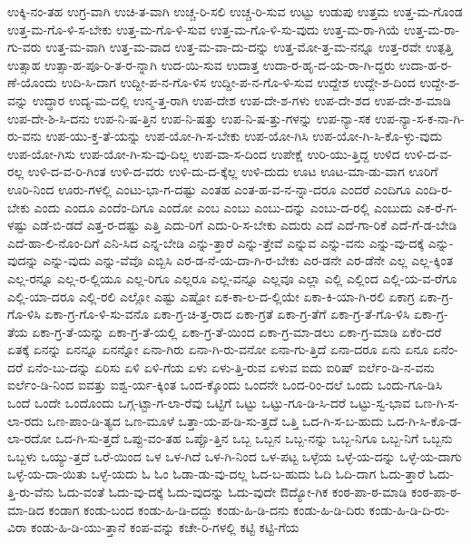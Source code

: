 {ಉಕ್ಕಿ-ನಂ-ತಹ
ಉಗ್ರ-ವಾಗಿ
ಉಚಿ-ತ-ವಾಗಿ
ಉಚ್ಚ-ರಿ-ಸಲಿ
ಉಚ್ಚ-ರಿ-ಸುವ
ಉಟ್ಟು
ಉಡುಪು
ಉತ್ತಮ
ಉತ್ತ-ಮ-ಗೊಂಡ
ಉತ್ತ-ಮ-ಗೊ-ಳಿ-ಸ-ಬೇಕು
ಉತ್ತ-ಮ-ಗೊ-ಳಿ-ಸುವ
ಉತ್ತ-ಮ-ಗೊ-ಳಿ-ಸು-ವುದು
ಉತ್ತ-ಮ-ರಾ-ಗಿಯೆ
ಉತ್ತ-ಮ-ರಾ-ಗು-ವರು
ಉತ್ತ-ಮ-ವಾಗಿ
ಉತ್ತ-ಮ-ವಾದ
ಉತ್ತ-ಮ-ವಾ-ದು-ದನ್ನು
ಉತ್ತ-ಮೋ-ತ್ತ-ಮ-ನನ್ನೂ
ಉತ್ತ-ರವೇ
ಉತ್ಪತ್ತಿ
ಉತ್ಸಾಹ
ಉತ್ಸಾ-ಹ-ಪೂ-ರಿ-ತ-ರ-ನ್ನಾಗಿ
ಉದ-ಯಿ-ಸುವ
ಉದಾತ್ತ
ಉದಾ-ರ-ಹೃ-ದ-ಯ-ರಾ-ಗಿ-ದ್ದರು
ಉದಾ-ಹ-ರ-ಣೆ-ಯೊಂದು
ಉದಿ-ಸಿ-ದಾಗ
ಉದ್ದೀ-ಪ-ನ-ಗೊ-ಳಿಸ
ಉದ್ದೀ-ಪ-ನ-ಗೊ-ಳಿ-ಸುವ
ಉದ್ದೇಶ
ಉದ್ದೇ-ಶ-ದಿಂದ
ಉದ್ದೇ-ಶ-ವನ್ನು
ಉದ್ಧಾರ
ಉದ್ಯ-ಮ-ದಲ್ಲಿ
ಉನ್ಮ-ತ್ತ-ರಾಗಿ
ಉಪ-ದೇಶ
ಉಪ-ದೇ-ಶ-ಗಳು
ಉಪ-ದೇ-ಶದ
ಉಪ-ದೇ-ಶ-ಮಾಡಿ
ಉಪ-ದೇ-ಶಿ-ಸಿ-ದನು
ಉಪ-ನಿ-ಷ-ತ್ತಿನ
ಉಪ-ನಿ-ಷತ್ತು
ಉಪ-ನಿ-ಷ-ತ್ತು-ಗಳನ್ನು
ಉಪ-ನ್ಯಾ-ಸಕ
ಉಪ-ನ್ಯಾ-ಸ-ಕ-ನಾ-ಗಿ-ರು-ವನು
ಉಪ-ಯು-ಕ್ತ-ತೆ-ಯನ್ನು
ಉಪ-ಯೋ-ಗಿ-ಸ-ಬೇಕು
ಉಪ-ಯೋ-ಗಿಸಿ
ಉಪ-ಯೋ-ಗಿ-ಸಿ-ಕೊ-ಳ್ಳು-ವುದು
ಉಪ-ಯೋ-ಗಿಸು
ಉಪ-ಯೋ-ಗಿ-ಸು-ವು-ದಿಲ್ಲ
ಉಪ-ವಾ-ಸ-ದಿಂದ
ಉಪೇಕ್ಷೆ
ಉರಿ-ಯು-ತ್ತಿದ್ದ
ಉಳಿದ
ಉಳಿ-ದ-ವ-ರಲ್ಲ
ಉಳಿ-ದ-ವ-ರಿ-ಗಿಂತ
ಉಳಿ-ದ-ವರು
ಉಳಿ-ದು-ದ-ಕ್ಕೆಲ್ಲ
ಉಳಿ-ದುದು
ಊಟ
ಊಟ-ಮಾ-ಡು-ವಾಗ
ಊರಿಗೆ
ಊರಿ-ನಿಂದ
ಊರು-ಗಳಲ್ಲಿ
ಎಂಟು-ಭಾ-ಗ-ದಷ್ಟು
ಎಂತಹ
ಎಂತ-ಹ-ವ-ನ-ನ್ನಾ-ದರೂ
ಎಂದರೆ
ಎಂದಿಗೂ
ಎಂದಿ-ರ-ಬೇಕು
ಎಂದು
ಎಂದೂ
ಎಂದೆಂ-ದಿಗೂ
ಎಂದೋ
ಎಂಬ
ಎಂಬು
ಎಂಬು-ದನ್ನು
ಎಂಬು-ದ-ರಲ್ಲಿ
ಎಂಬುದು
ಎಕ-ರೆ-ಗ-ಳಷ್ಟು
ಎಡೆ-ಬಿ-ಡದೆ
ಎತ್ತ-ರ-ದಷ್ಟು
ಎತ್ತಿ
ಎದು-ರಿಗೆ
ಎದು-ರಿ-ಸ-ಬೇಕು
ಎದುರು
ಎದೆ
ಎದೆ-ಗಾ-ರಿಕೆ
ಎದೆ-ಗೆ-ಡ-ಬೇಡಿ
ಎದೆ-ಹಾ-ಲಿ-ನೊಂ-ದಿಗೆ
ಎನಿ-ಸಿದ
ಎನ್ನ-ಬೇಡಿ
ಎನ್ನು-ತ್ತಾರೆ
ಎನ್ನು-ತ್ತೇವೆ
ಎನ್ನುವ
ಎನ್ನು-ವನು
ಎನ್ನು-ವು-ದಕ್ಕೆ
ಎನ್ನು-ವುದನ್ನು
ಎನ್ನು-ವುದು
ಎನ್ನು-ವೆವೊ
ಎಬ್ಬಿಸಿ
ಎರ-ಡ-ನೆ-ಯ-ದಾ-ಗಿ-ರ-ಬೇಕು
ಎರ-ಡನೇ
ಎರ-ಡೆನೇ
ಎಲ್ಲ
ಎಲ್ಲ-ಕ್ಕಿಂತ
ಎಲ್ಲ-ರನ್ನೂ
ಎಲ್ಲ-ರ-ಲ್ಲಿಯೂ
ಎಲ್ಲ-ರಿಗೂ
ಎಲ್ಲರೂ
ಎಲ್ಲ-ವನ್ನೂ
ಎಲ್ಲವೂ
ಎಲ್ಲಾ
ಎಲ್ಲಿ
ಎಲ್ಲಿಂದ
ಎಲ್ಲಿ-ಯ-ವ-ರೆಗೂ
ಎಲ್ಲಿ-ಯಾ-ದರೂ
ಎಲ್ಲಿ-ರಲಿ
ಎಲ್ಲೋ
ಎಷ್ಟು
ಎಷ್ಟೋ
ಏಕ-ಕಾ-ಲ-ದ-ಲ್ಲಿಯೇ
ಏಕಾ-ಕಿ-ಯಾ-ಗಿ-ರಲಿ
ಏಕಾಗ್ರ
ಏಕಾ-ಗ್ರ-ಗೊ-ಳಿಸಿ
ಏಕಾ-ಗ್ರ-ಗೊ-ಳಿ-ಸು-ವನೊ
ಏಕಾ-ಗ್ರ-ಚಿ-ತ್ತ-ರಾದ
ಏಕಾ-ಗ್ರತೆ
ಏಕಾ-ಗ್ರ-ತೆಗೆ
ಏಕಾ-ಗ್ರ-ತೆ-ಗೊ-ಳಿಸಿ
ಏಕಾ-ಗ್ರ-ತೆಯ
ಏಕಾ-ಗ್ರ-ತೆ-ಯನ್ನು
ಏಕಾ-ಗ್ರ-ತೆ-ಯಲ್ಲಿ
ಏಕಾ-ಗ್ರ-ತೆ-ಯಿಂದ
ಏಕಾ-ಗ್ರ-ಮಾ-ಡಲು
ಏಕಾ-ಗ್ರ-ಮಾಡಿ
ಏಕೆಂ-ದರೆ
ಏತಕ್ಕೆ
ಏನನ್ನು
ಏನನ್ನೂ
ಏನನ್ನೋ
ಏನಾ-ಗಿರು
ಏನಾ-ಗಿ-ರು-ವನೋ
ಏನಾ-ಗು-ತ್ತಿದೆ
ಏನಾ-ದರೂ
ಏನು
ಏನೂ
ಏನೆಂ-ದರೆ
ಏನೆಂ-ಬು-ದನ್ನು
ಏರಿಸು
ಏಳಿ
ಏಳಿ-ಗೆಯ
ಏಳು
ಏಳು-ತ್ತಿ-ರುವ
ಏಳುವ
ಐದು
ಐರಿಷ್
ಐರ್ಲೆಂ-ಡಿ-ನ-ವನು
ಐರ್ಲೆಂ-ಡಿ-ನಿಂದ
ಐವತ್ತು
ಐಶ್ವ-ರ್ಯ-ಕ್ಕಿಂತ
ಒಂದ-ಕ್ಕೊಂದು
ಒಂದನೇ
ಒಂದ-ರಿಂ-ದಲೆ
ಒಂದು
ಒಂದು-ಗೂ-ಡಿಸಿ
ಒಂದೆ
ಒಂದೇ
ಒಂದೊಂದು
ಒಗ್ಗ-ಟ್ಟಾ-ಗ-ಲಾ-ರೆವು
ಒಟ್ಟಿಗೆ
ಒಟ್ಟು
ಒಟ್ಟು-ಗೂ-ಡಿ-ಸಿ-ದರೆ
ಒಟ್ಟು-ಸ್ವ-ಭಾವ
ಒಣ-ಗಿ-ಸ-ಲಾ-ರದು
ಒಣ-ಪಾಂ-ಡಿ-ತ್ಯದ
ಒಣ-ಮೂಳೆ
ಒತ್ತಾ-ಯ-ಪ-ಡಿ-ಸು-ತ್ತದೆ
ಒತ್ತಿ
ಒದ-ಗಿ-ಸ-ಬ-ಹುದು
ಒದ-ಗಿ-ಸಿ-ಕೊ-ಡ-ಲಾ-ರದೋ
ಒದ-ಗಿ-ಸು-ತ್ತದೆ
ಒಪ್ಪು-ವಂ-ತಹ
ಒಪ್ಪೊ-ತ್ತಿನ
ಒಬ್ಬ
ಒಬ್ಬನ
ಒಬ್ಬ-ನನ್ನು
ಒಬ್ಬ-ನಿಗೂ
ಒಬ್ಬ-ನಿಗೆ
ಒಬ್ಬನು
ಒಬ್ಬಳು
ಒಯ್ಯು-ತ್ತದೆ
ಒರೆ-ಯಿಂದ
ಒಳ
ಒಳ-ಗಿದೆ
ಒಳ-ಗಿ-ನಿಂದ
ಒಳ-ಪಟ್ಟ
ಒಳ್ಳೆಯ
ಒಳ್ಳೆ-ಯ-ದನ್ನು
ಒಳ್ಳೆ-ಯ-ದಾಗು
ಒಳ್ಳೆ-ಯ-ದಾ-ಯಿತು
ಒಳ್ಳೆ-ಯದು
ಓ
ಓಂ
ಓಡಾ-ಡು-ವು-ದಲ್ಲ
ಓದ-ಬ-ಹುದು
ಓದಿ
ಓದಿ-ದಾಗ
ಓದು-ತ್ತಾರೆ
ಓದು-ತ್ತಿ-ರು-ವೆನು
ಓದು-ವಂತೆ
ಓದು-ವು-ದಕ್ಕೆ
ಓದು-ವುದನ್ನು
ಓದು-ವುದೇ
ಔದ್ಯೋ-ಗಿಕ
ಕಂಠ-ಪಾ-ಠ-ಮಾಡಿ
ಕಂಠ-ಪಾ-ಠ-ಮಾ-ಡಿದ
ಕಂಡಾಗ
ಕಂಡು-ಬಂದ
ಕಂಡು-ಹಿ-ಡಿ-ದದ್ದು
ಕಂಡು-ಹಿ-ಡಿ-ದನು
ಕಂಡು-ಹಿ-ಡಿ-ದಿರು
ಕಂಡು-ಹಿ-ಡಿ-ದಿ-ರು-ವಿರಾ
ಕಂಡು-ಹಿ-ಡಿ-ಯು-ತ್ತಾನೆ
ಕಂಪ-ವನ್ನು
ಕಚೇ-ರಿ-ಗಳಲ್ಲಿ
ಕಟ್ಟಿ
ಕಟ್ಟಿ-ಗೆಯ
}
